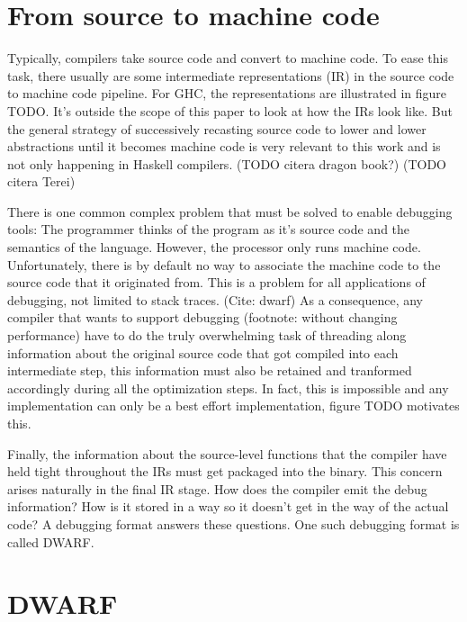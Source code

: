 

\section{From source to machine code}

Typically, compilers take source code and convert to machine code. To ease this
task, there usually are some intermediate representations (IR) in the source
code to machine code pipeline.  For GHC, the representations are illustrated in
figure TODO. It's outside the scope of this paper to look at how the IRs
look like. But the general strategy of successively recasting source code to lower and
lower abstractions until it becomes machine code is very relevant to this work
and is not only happening in Haskell compilers. (TODO citera dragon book?) (TODO citera Terei)

There is one common complex problem that must be solved to enable debugging
tools: The programmer thinks of the program as it's source code and the
semantics of the language. However, the processor only runs machine code.
Unfortunately, there is by default no way to associate the machine code to the
source code that it originated from. This is a problem for all applications of
debugging, not limited to stack traces. (Cite: dwarf) As a consequence, any
compiler that wants to support debugging (footnote: without changing
performance) have to do the truly overwhelming task of threading along
information about the original source code that got compiled into each
intermediate step, this information must also be retained and tranformed
accordingly during all the optimization steps. In fact, this is impossible and
any implementation can only be a best effort implementation, figure TODO
motivates this.

Finally, the information  about the source-level functions that the compiler
have held tight throughout the IRs must get packaged into the binary. This
concern arises naturally in the final IR stage.  How does the compiler emit the
debug information? How is it stored in a way so it doesn't get in the way of the
actual code?  A debugging format answers these questions. One such debugging
format is called DWARF.

\section{DWARF}

